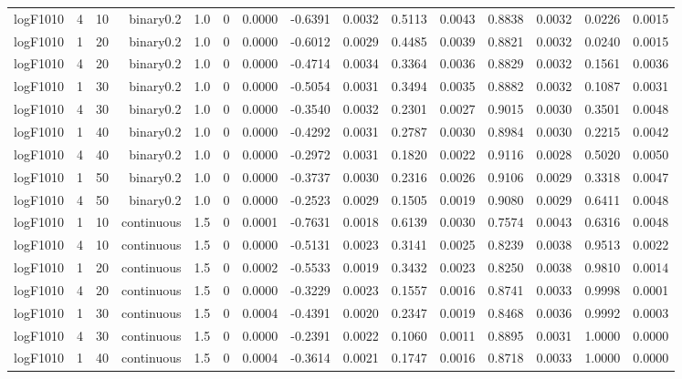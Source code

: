 \begin{longtable}{rrrrrrrrrrrrrrr}
  logF1010 & 4 & 10 & binary0.2 & 1.0 & 0 & 0.0000 & -0.6391 & 0.0032 & 0.5113 & 0.0043 & 0.8838 & 0.0032 & 0.0226 & 0.0015 \\ 
  logF1010 & 1 & 20 & binary0.2 & 1.0 & 0 & 0.0000 & -0.6012 & 0.0029 & 0.4485 & 0.0039 & 0.8821 & 0.0032 & 0.0240 & 0.0015 \\ 
  logF1010 & 4 & 20 & binary0.2 & 1.0 & 0 & 0.0000 & -0.4714 & 0.0034 & 0.3364 & 0.0036 & 0.8829 & 0.0032 & 0.1561 & 0.0036 \\ 
  logF1010 & 1 & 30 & binary0.2 & 1.0 & 0 & 0.0000 & -0.5054 & 0.0031 & 0.3494 & 0.0035 & 0.8882 & 0.0032 & 0.1087 & 0.0031 \\ 
  logF1010 & 4 & 30 & binary0.2 & 1.0 & 0 & 0.0000 & -0.3540 & 0.0032 & 0.2301 & 0.0027 & 0.9015 & 0.0030 & 0.3501 & 0.0048 \\ 
  logF1010 & 1 & 40 & binary0.2 & 1.0 & 0 & 0.0000 & -0.4292 & 0.0031 & 0.2787 & 0.0030 & 0.8984 & 0.0030 & 0.2215 & 0.0042 \\ 
  logF1010 & 4 & 40 & binary0.2 & 1.0 & 0 & 0.0000 & -0.2972 & 0.0031 & 0.1820 & 0.0022 & 0.9116 & 0.0028 & 0.5020 & 0.0050 \\ 
  logF1010 & 1 & 50 & binary0.2 & 1.0 & 0 & 0.0000 & -0.3737 & 0.0030 & 0.2316 & 0.0026 & 0.9106 & 0.0029 & 0.3318 & 0.0047 \\ 
  logF1010 & 4 & 50 & binary0.2 & 1.0 & 0 & 0.0000 & -0.2523 & 0.0029 & 0.1505 & 0.0019 & 0.9080 & 0.0029 & 0.6411 & 0.0048 \\ 
  logF1010 & 1 & 10 & continuous & 1.5 & 0 & 0.0001 & -0.7631 & 0.0018 & 0.6139 & 0.0030 & 0.7574 & 0.0043 & 0.6316 & 0.0048 \\ 
  logF1010 & 4 & 10 & continuous & 1.5 & 0 & 0.0000 & -0.5131 & 0.0023 & 0.3141 & 0.0025 & 0.8239 & 0.0038 & 0.9513 & 0.0022 \\ 
  logF1010 & 1 & 20 & continuous & 1.5 & 0 & 0.0002 & -0.5533 & 0.0019 & 0.3432 & 0.0023 & 0.8250 & 0.0038 & 0.9810 & 0.0014 \\ 
  logF1010 & 4 & 20 & continuous & 1.5 & 0 & 0.0000 & -0.3229 & 0.0023 & 0.1557 & 0.0016 & 0.8741 & 0.0033 & 0.9998 & 0.0001 \\ 
  logF1010 & 1 & 30 & continuous & 1.5 & 0 & 0.0004 & -0.4391 & 0.0020 & 0.2347 & 0.0019 & 0.8468 & 0.0036 & 0.9992 & 0.0003 \\ 
  logF1010 & 4 & 30 & continuous & 1.5 & 0 & 0.0000 & -0.2391 & 0.0022 & 0.1060 & 0.0011 & 0.8895 & 0.0031 & 1.0000 & 0.0000 \\ 
  logF1010 & 1 & 40 & continuous & 1.5 & 0 & 0.0004 & -0.3614 & 0.0021 & 0.1747 & 0.0016 & 0.8718 & 0.0033 & 1.0000 & 0.0000 \\ 

\end{longtable}
